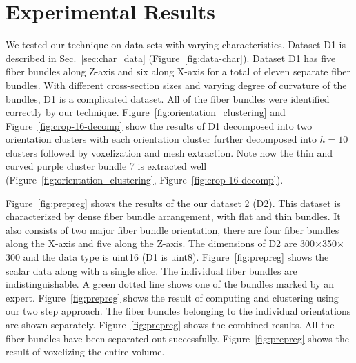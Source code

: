 \section{Experimental Results}
\label{sec:results}
We tested our technique on data sets with varying characteristics.
Dataset D1 is described in Sec.~\ref{sec:char_data} (Figure~\ref{fig:data-char}). Dataset D1 has five fiber bundles along Z-axis and six along X-axis for a total of eleven separate fiber bundles. 
With different cross-section sizes and varying degree of curvature of the bundles, D1 is a complicated dataset. All of the fiber bundles were identified correctly by our technique.
Figure~\ref{fig:orientation_clustering} and Figure~\ref{fig:crop-16-decomp} show the results of D1 decomposed into two orientation clusters with each orientation cluster further decomposed into $h=10$ clusters followed by voxelization and mesh extraction.  Note how the thin and curved purple cluster bundle 7 is extracted well (Figure~\ref{fig:orientation_clustering}, Figure~\ref{fig:crop-16-decomp}). 

Figure~\ref{fig:prepreg} shows the results of the our dataset 2 (D2). This dataset is characterized by dense fiber bundle arrangement, with flat and thin bundles. 
It also consists of two major fiber bundle orientation, there are four fiber bundles along the X-axis and five along the Z-axis. The dimensions of D2 are 300$\times$350$\times$300 and the data type is uint16 (D1 is uint8). Figure~\ref{fig:prepreg} shows the scalar data along with a single slice. The individual fiber bundles are indistinguishable. A green dotted line shows one of the bundles marked by an expert. 
Figure~\ref{fig:prepreg} shows the result of computing \mt and clustering using our two step approach. The fiber bundles belonging to the individual orientations are shown separately.
Figure~\ref{fig:prepreg} shows the combined results. All the fiber bundles have been separated out successfully. Figure~\ref{fig:prepreg} shows the result of voxelizing the entire volume. 

